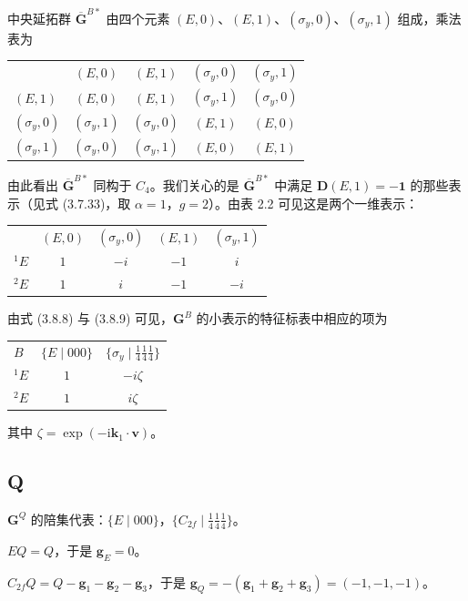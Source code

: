 中央延拓群 $\overline{\mathbf{G}}^{B*}$ 由四个元素 $(E, 0)$、$(E, 1)$、$(\sigma_{y}, 0)$、$(\sigma_{y}, 1)$ 组成，乘法表为
\begin{center}
\begin{tabular}{lcccc}
 & $(E, 0)$ & $(E, 1)$ & $(\sigma_{y}, 0)$ & $(\sigma_{y}, 1)$\\
$(E, 1)$ & $(E, 0)$ & $(E, 1)$ & $(\sigma_{y}, 1)$ & $(\sigma_{y}, 0)$\\
$(\sigma_{y}, 0)$ & $(\sigma_{y}, 1)$ & $(\sigma_{y}, 0)$ & $(E, 1)$ & $(E, 0)$\\
$(\sigma_{y}, 1)$ & $(\sigma_{y}, 0)$ & $(\sigma_{y}, 1)$ & $(E, 0)$ & $(E, 1)$
\end{tabular}
\end{center}
由此看出 $\overline{\mathbf{G}}^{B*}$ 同构于 $C_{4}$。我们关心的是 $\overline{\mathbf{G}}^{B*}$ 中满足 $\mathbf{D}(E, 1) = -\mathbf{1}$ 的那些表示（见式 (3.7.33)，取 $\alpha = 1$，$g = 2$）。由表 2.2 可见这是两个一维表示：
\begin{center}
\begin{tabular}{lcccc}
 & $(E, 0)$ & $(\sigma_{y}, 0)$ & $(E, 1)$ & $(\sigma_{y}, 1)$\\
${}^{1}E$ & $1$ & $-i$ & $-1$ & $i$\\
${}^{2}E$ & $1$ & $i$ & $-1$ & $-i$
\end{tabular}
\end{center}
由式 (3.8.8) 与 (3.8.9) 可见，$\mathbf{G}^{B}$ 的小表示的特征标表中相应的项为
\begin{center}
\begin{tabular}{lcc}
$B$ & $\{E \mid 000\}$ & $\{\sigma_{y} \mid \frac{1}{4}\frac{1}{4}\frac{1}{4}\}$\\
${}^{1}E$ & $1$ & $-i\zeta$\\
${}^{2}E$ & $1$ & $i\zeta$
\end{tabular}
\end{center}
其中 $\zeta = \exp(-\mathrm{i}\mathbf{k}_{1} \cdot \mathbf{v})$。

\subsection*{Q}

$\mathbf{G}^{Q}$ 的陪集代表：$\{E \mid 000\}$，$\{C_{2f} \mid {\frac{1}{4}}{\frac{1}{4}}{\frac{1}{4}}\}$。

$EQ = Q$，于是 $\mathbf{g}_{E} = 0$。

$C_{2f}Q = Q - \mathbf{g}_{1} - \mathbf{g}_{2} - \mathbf{g}_{3}$，于是 $\mathbf{g}_{Q} = -(\mathbf{g}_{1} + \mathbf{g}_{2} + \mathbf{g}_{3}) = (-1, -1, -1)$。

